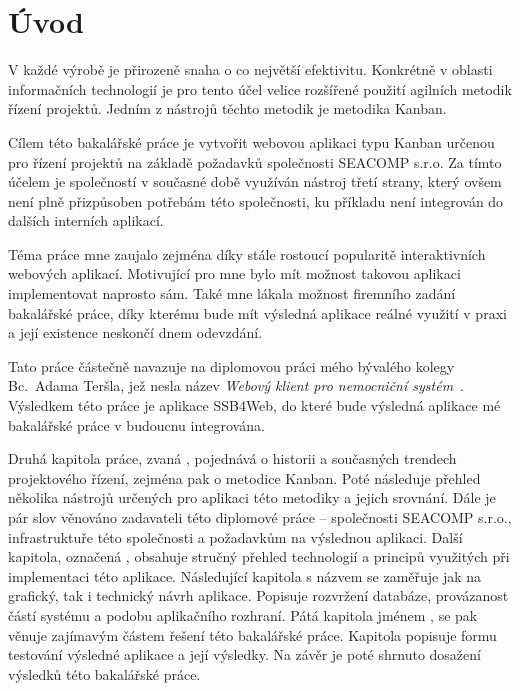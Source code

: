 \chapter{Úvod}
V každé výrobě je přirozeně snaha o co největší efektivitu. Konkrétně v oblasti informačních technologií je pro tento účel velice rozšířené použití agilních metodik řízení projektů. Jedním z nástrojů těchto metodik je metodika Kanban.

Cílem této bakalářské práce je vytvořit webovou aplikaci typu Kanban určenou pro řízení projektů na základě požadavků společnosti SEACOMP s.r.o. Za tímto účelem je společností v současné době využíván nástroj třetí strany, který ovšem není plně přizpůsoben potřebám této společnosti, ku příkladu není integrován do dalších interních aplikací.

Téma práce mne zaujalo zejména díky stále rostoucí popularitě interaktivních webových aplikací. Motivující pro mne bylo mít možnost takovou aplikaci implementovat naprosto sám. Také mne lákala možnost firemního zadání bakalářské práce, díky kterému bude mít výsledná aplikace reálné využití v praxi a její existence neskončí dnem odevzdání. 

Tato práce částečně navazuje na diplomovou práci mého bývalého kolegy Bc.~Adama Teršla, jež nesla název \emph{Webový klient pro nemocniční systém}~\cite{bib:tersl}. Výsledkem této práce je aplikace SSB4Web, do které bude výsledná aplikace mé bakalářské práce v budoucnu integrována.

Druhá kapitola práce, zvaná , pojednává o historii a současných trendech projektového řízení, zejména pak o metodice Kanban. Poté následuje přehled několika nástrojů určených pro aplikaci této metodiky a jejich srovnání.
Dále je pár slov věnováno zadavateli této diplomové práce -- společnosti SEACOMP s.r.o., infrastruktuře této společnosti a požadavkům na výslednou aplikaci.
Další kapitola, označená , obsahuje stručný přehled technologií a principů využitých při implementaci této aplikace.
Následující kapitola s názvem  se zaměřuje jak na grafický, tak i technický návrh aplikace. Popisuje rozvržení databáze, provázanost částí systému a podobu aplikačního rozhraní.
Pátá kapitola jménem , se pak věnuje zajímavým částem řešení této bakalářské práce. 
Kapitola  popisuje formu testování výsledné aplikace a její výsledky.
Na závěr je poté shrnuto dosažení výsledků této bakalářské práce.



